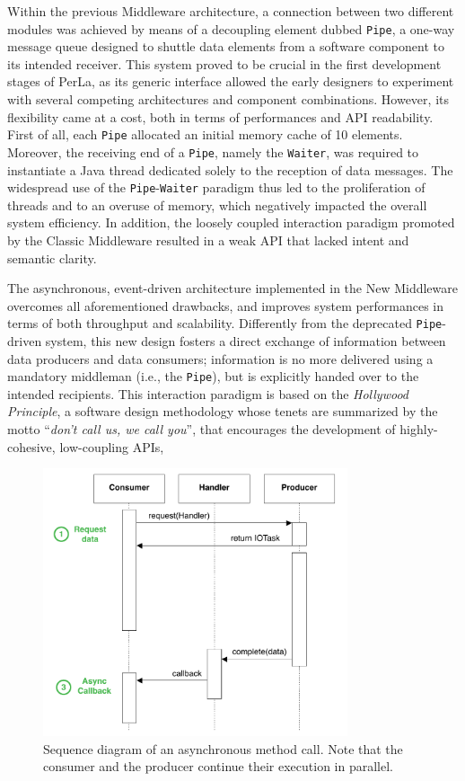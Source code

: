 Within the previous Middleware architecture, a connection between two different
modules was achieved by means of a decoupling element dubbed \texttt{Pipe}, a
one-way message queue designed to shuttle data elements from a software
component to its intended receiver. This system proved to be crucial in the
first development stages of PerLa, as its generic interface allowed the early
designers to experiment with several competing architectures and component
combinations. However, its flexibility came at a cost, both in terms of
performances and API readability. First of all, each \texttt{Pipe} allocated an
initial memory cache of 10 elements. Moreover, the receiving end of a
\texttt{Pipe}, namely the \texttt{Waiter}, was required to instantiate a Java
thread dedicated solely to the reception of data messages. The widespread use
of the \texttt{Pipe}-\texttt{Waiter} paradigm thus led to the proliferation of
threads and to an overuse of memory, which negatively impacted the overall
system efficiency. In addition, the loosely coupled interaction paradigm
promoted by the Classic Middleware resulted in a weak API that lacked intent
and semantic clarity.

The asynchronous, event-driven architecture implemented in the New Middleware
overcomes all aforementioned drawbacks, and improves system performances in
terms of both throughput and scalability. Differently from the deprecated
\texttt{Pipe}-driven system, this new design fosters a direct exchange of
information between data producers and data consumers; information is no more
delivered using a mandatory middleman (i.e., the \texttt{Pipe}), but is
explicitly handed over to the intended recipients. This interaction paradigm is
based on the \textit{Hollywood Principle}, a software design methodology whose
tenets are summarized by the motto ``\textit{don't call us, we call you}'',
that encourages the development of highly-cohesive, low-coupling APIs, 

\begin{figure}[h!]
\center
\includegraphics[width=0.8\textwidth]{imgs/async_paradigm.pdf}
\caption{Sequence diagram of an asynchronous method call. Note that the
consumer and the producer continue their execution in parallel.}
\label{fig:async_paradigm}
\end{figure}

